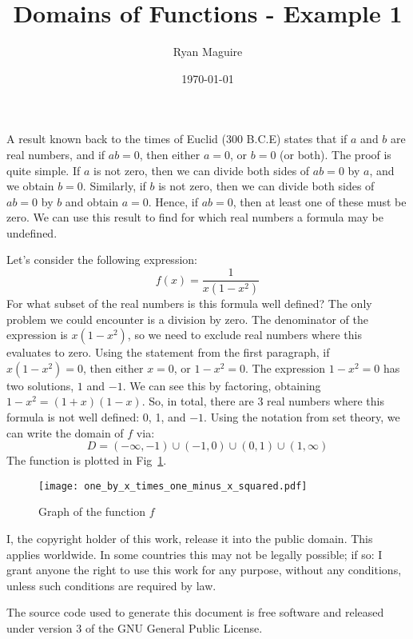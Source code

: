 \documentclass{article}
\title{Domains of Functions - Example 1}
\author{Ryan Maguire}
\date{\today}
\begin{document}
    \maketitle
    A result known back to the times of Euclid (300 B.C.E) states that if
    $a$ and $b$ are real numbers, and if $ab=0$, then either $a=0$, or
    $b=0$ (or both). The proof is quite simple. If $a$ is not zero, then
    we can divide both sides of $ab=0$ by $a$, and we obtain $b=0$. Similarly,
    if $b$ is not zero, then we can divide both sides of $ab=0$ by $b$ and
    obtain $a=0$. Hence, if $ab=0$, then at least one of these must be zero.
    We can use this result to find for which real numbers a formula may be
    undefined.
    \par\hfill\par
    Let's consider the following expression:
    \begin{equation}
        f(x)=\frac{1}{x(1-x^{2})}
    \end{equation}
    For what subset of the real numbers is this formula well defined? The only
    problem we could encounter is a division by zero. The denominator of the
    expression is $x(1-x^{2})$, so we need to exclude real numbers where this
    evaluates to zero. Using the statement from the first paragraph, if
    $x(1-x^{2})=0$, then either $x=0$, or $1-x^{2}=0$. The expression
    $1-x^{2}=0$ has two solutions, $1$ and $-1$. We can see this by factoring,
    obtaining $1-x^{2}=(1+x)(1-x)$. So, in total, there are 3 real numbers
    where this formula is not well defined: 0, 1, and $-1$. Using the notation
    from set theory, we can write the domain of $f$ via:
    \begin{equation}
        D=(-\infty,-1)\cup(-1,0)\cup(0,1)\cup(1,\infty)
    \end{equation}
    The function is plotted in Fig~\ref{fig:graph_of_f}.
    \begin{figure}
        \centering
        \texttt{[image: one\_by\_x\_times\_one\_minus\_x\_squared.pdf]}
        \caption{Graph of the function $f$}
        \label{fig:graph_of_f}
    \end{figure}
    \newpage
    I, the copyright holder of this work, release it into the public domain.
    This applies worldwide. In some countries this may not be legally possible;
    if so: I grant anyone the right to use this work for any purpose, without
    any conditions, unless such conditions are required by law.
    \par\hfill\par
    The source code used to generate this document is free software and released
    under version 3 of the GNU General Public License.
\end{document}

